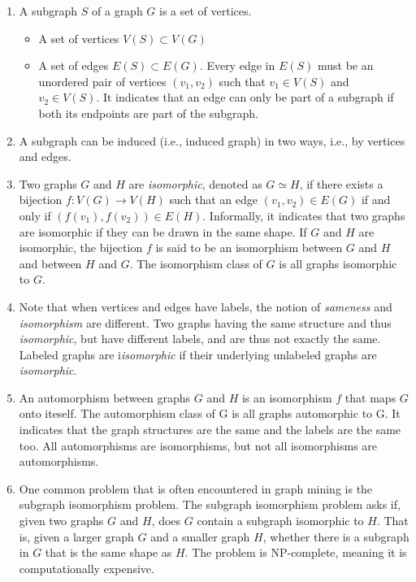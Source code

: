 \documentclass[14pt]{article}
\begin{document}
\begin{enumerate}
 \item A subgraph $S$ of a graph $G$ is a set of vertices.
  \begin{itemize}
   \item A set of vertices $V(S) \subset V(G)$
   \item A set of edges $E(S) \subset E(G)$. Every edge in $E(S)$ must be an unordered pair of vertices $(v_1, v_2)$ such that $v_1 \in V(S)$ and $v_2 \in V(S)$. It indicates that an edge can only be part of a subgraph if both its endpoints are part of the subgraph.
  \end{itemize}

\item A subgraph can be induced (i.e., induced graph) in two ways, i.e., by vertices and edges.

\item Two graphs $G$ and $H$ are \emph{isomorphic}, denoted as $G \simeq H$, if there exists a bijection $f: V(G) \rightarrow V(H)$ such that an edge $(v_1, v_2) \in E(G)$ if and only if $(f(v_1), f(v_2)) \in E(H)$. Informally, it indicates that two graphs are isomorphic if they can be drawn in the same shape. If $G$ and $H$ are isomorphic, the bijection $f$ is said to be an isomorphism between $G$ and $H$ and between $H$ and $G$. The isomorphism class of $G$ is all graphs isomorphic to $G$. 

\item Note that when vertices and edges have labels, the notion of \emph{sameness} and \emph{isomorphism} are different. Two graphs having the same structure and thus \emph{isomorphic}, but have different labels, and are thus not exactly the same. Labeled graphs are i\emph{isomorphic} if their underlying unlabeled graphs are \emph{isomorphic}. 

\item An automorphism between graphs $G$ and $H$ is an isomorphism $f$ that maps $G$ onto iteself. The automorphism class of G is all graphs automorphic to G. It indicates that the graph structures are the same and the labels are the same too. All automorphisms are isomorphisms, but not all isomorphisms are automorphisms. 

\item One common problem that is often encountered in graph mining is the subgraph isomorphism problem. The subgraph isomorphism problem asks if, given two graphs $G$ and $H$, does $G$ contain a subgraph isomorphic to $H$. That is, given a larger graph $G$ and a smaller graph $H$, whether there is a subgraph in $G$ that is the same shape as $H$. The problem is NP-complete, meaning it is computationally expensive.


\end{enumerate}
\end{document}
